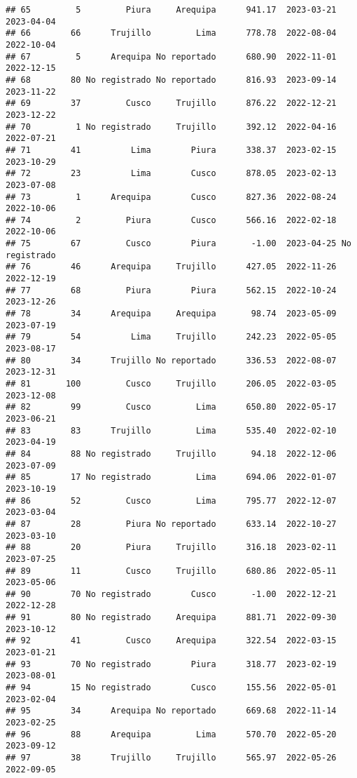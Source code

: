 \documentclass[
]{article}
\begin{document}
\begin{verbatim}
## 65         5         Piura     Arequipa      941.17  2023-03-21    2023-04-04
## 66        66      Trujillo         Lima      778.78  2022-08-04    2022-10-04
## 67         5      Arequipa No reportado      680.90  2022-11-01    2022-12-15
## 68        80 No registrado No reportado      816.93  2023-09-14    2023-11-22
## 69        37         Cusco     Trujillo      876.22  2022-12-21    2023-12-22
## 70         1 No registrado     Trujillo      392.12  2022-04-16    2022-07-21
## 71        41          Lima        Piura      338.37  2023-02-15    2023-10-29
## 72        23          Lima        Cusco      878.05  2023-02-13    2023-07-08
## 73         1      Arequipa        Cusco      827.36  2022-08-24    2022-10-06
## 74         2         Piura        Cusco      566.16  2022-02-18    2022-10-06
## 75        67         Cusco        Piura       -1.00  2023-04-25 No registrado
## 76        46      Arequipa     Trujillo      427.05  2022-11-26    2022-12-19
## 77        68         Piura        Piura      562.15  2022-10-24    2023-12-26
## 78        34      Arequipa     Arequipa       98.74  2023-05-09    2023-07-19
## 79        54          Lima     Trujillo      242.23  2022-05-05    2023-08-17
## 80        34      Trujillo No reportado      336.53  2022-08-07    2023-12-31
## 81       100         Cusco     Trujillo      206.05  2022-03-05    2023-12-08
## 82        99         Cusco         Lima      650.80  2022-05-17    2023-06-21
## 83        83      Trujillo         Lima      535.40  2022-02-10    2023-04-19
## 84        88 No registrado     Trujillo       94.18  2022-12-06    2023-07-09
## 85        17 No registrado         Lima      694.06  2022-01-07    2023-10-19
## 86        52         Cusco         Lima      795.77  2022-12-07    2023-03-04
## 87        28         Piura No reportado      633.14  2022-10-27    2023-03-10
## 88        20         Piura     Trujillo      316.18  2023-02-11    2023-07-25
## 89        11         Cusco     Trujillo      680.86  2022-05-11    2023-05-06
## 90        70 No registrado        Cusco       -1.00  2022-12-21    2022-12-28
## 91        80 No registrado     Arequipa      881.71  2022-09-30    2023-10-12
## 92        41         Cusco     Arequipa      322.54  2022-03-15    2023-01-21
## 93        70 No registrado        Piura      318.77  2023-02-19    2023-08-01
## 94        15 No registrado        Cusco      155.56  2022-05-01    2023-02-04
## 95        34      Arequipa No reportado      669.68  2022-11-14    2023-02-25
## 96        88      Arequipa         Lima      570.70  2022-05-20    2023-09-12
## 97        38      Trujillo     Trujillo      565.97  2022-05-26    2022-09-05

\end{verbatim}
\end{document}
